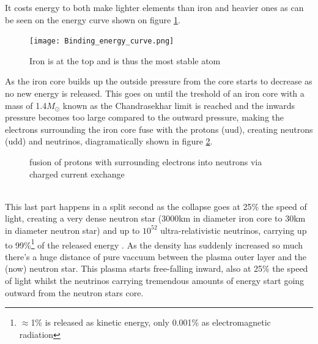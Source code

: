 It costs energy to both make lighter elements than iron and heavier ones as can
be seen on the energy curve shown on figure \ref{fig:BindingEnergyCurve}.
\begin{figure}[!ht]
	\centering
	\texttt{[image: Binding\_energy\_curve.png]}
	\caption{Iron is at the top and is thus the most stable atom}
	\label{fig:BindingEnergyCurve}
\end{figure}
As the iron core builds up the outside
pressure from the core starts to decrease as no new energy is released. This
goes on until  the treshold of an iron core with a mass of 1.4$M_\odot$ known
as the Chandrasekhar limit\cite{Chandrasekhar}\cite{weinberg1972gravitation} 
is reached and the inwards pressure becomes too
large compared to the outward pressure, making the electrons surrounding the
iron core fuse with the protons (uud), creating neutrons (udd) and neutrinos,
diagramatically shown in figure
\ref{fig:CoreFusion}.
\begin{figure}[h]
	\centering
	\caption{fusion of protons with surrounding electrons into neutrons via charged current exchange}
	\label{fig:CoreFusion}
\end{figure}\\
This last part happens in a split second as the collapse goes at 25\% the speed
of light, creating a very dense neutron star (3000km in diameter iron core to
30km in diameter neutron star) and up to $10^{52}$ ultra-relativistic
neutrinos, carrying up to 99\%\footnote{$\approx$1\% is released as kinetic energy, only 0.001\% as
electromagnetic radiation} of the released energy
\cite{Melson_2015}. As the density has suddenly increased so much
there's a huge distance of pure vaccuum between the plasma outer layer and the
(now) neutron star. This plasma starts free-falling inward, also at 25\% the
speed of light whilst the neutrinos carrying tremendous amounts of energy start
going outward from the neutron stars core.

